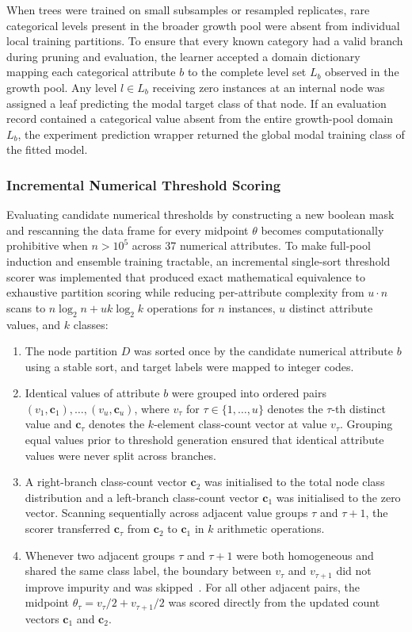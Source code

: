 When trees were trained on small subsamples or resampled replicates, rare categorical levels present in the broader growth pool were absent from individual local training partitions. To ensure that every known category had a valid branch during pruning and evaluation, the learner accepted a domain dictionary mapping each categorical attribute $b$ to the complete level set $L_b$ observed in the growth pool. Any level $l \in L_b$ receiving zero instances at an internal node was assigned a leaf predicting the modal target class of that node. If an evaluation record contained a categorical value absent from the entire growth-pool domain $L_b$, the experiment prediction wrapper returned the global modal training class of the fitted model.

\subsubsection{Incremental Numerical Threshold Scoring}
Evaluating candidate numerical thresholds by constructing a new boolean mask and rescanning the data frame for every midpoint $\theta$ becomes computationally prohibitive when $n > 10^5$ across 37 numerical attributes. To make full-pool induction and ensemble training tractable, an incremental single-sort threshold scorer was implemented that produced exact mathematical equivalence to exhaustive partition scoring while reducing per-attribute complexity from $u \cdot n$ scans to $n \log_2 n + u k \log_2 k$ operations for $n$ instances, $u$ distinct attribute values, and $k$ classes:
\begin{enumerate}
    \item The node partition $D$ was sorted once by the candidate numerical attribute $b$ using a stable sort, and target labels were mapped to integer codes.
    \item Identical values of attribute $b$ were grouped into ordered pairs $(v_1, \mathbf{c}_1), \dots, (v_u, \mathbf{c}_u)$, where $v_\tau$ for $\tau \in \{1, \dots, u\}$ denotes the $\tau$-th distinct value and $\mathbf{c}_\tau$ denotes the $k$-element class-count vector at value $v_\tau$. Grouping equal values prior to threshold generation ensured that identical attribute values were never split across branches.
    \item A right-branch class-count vector $\mathbf{c}_2$ was initialised to the total node class distribution and a left-branch class-count vector $\mathbf{c}_1$ was initialised to the zero vector. Scanning sequentially across adjacent value groups $\tau$ and $\tau + 1$, the scorer transferred $\mathbf{c}_\tau$ from $\mathbf{c}_2$ to $\mathbf{c}_1$ in $k$ arithmetic operations.
    \item Whenever two adjacent groups $\tau$ and $\tau + 1$ were both homogeneous and shared the same class label, the boundary between $v_\tau$ and $v_{\tau+1}$ did not improve impurity and was skipped~\cite{Kelleher2020}. For all other adjacent pairs, the midpoint $\theta_\tau = v_\tau / 2 + v_{\tau+1} / 2$ was scored directly from the updated count vectors $\mathbf{c}_1$ and $\mathbf{c}_2$.
\end{enumerate}

